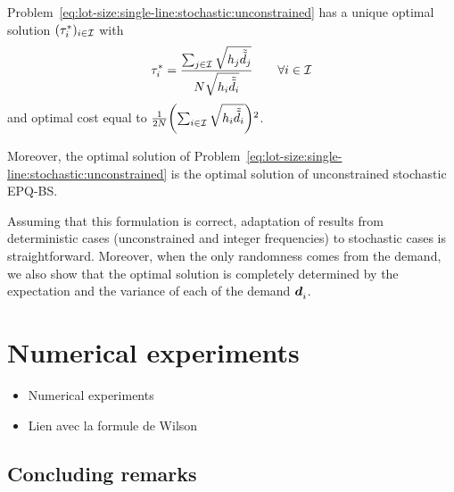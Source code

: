 \begin{thm}\label{thm:lot-size:single-line:stochastic:unconstrained:optimality}
Problem~\eqref{eq:lot-size:single-line:stochastic:unconstrained} has a unique optimal solution $(\tau_i^*)_{i\in\mathcal{I}}$ with
\begin{equation}
  \tau_i^*= \frac{\sum_{j\in\mathcal{I}}\sqrt{h_j\tilde{\tilde{d}}_j}}{N\sqrt{h_i\tilde{\tilde{d}}_i}}\qquad\forall i\in\mathcal{I}
\end{equation}
and optimal cost equal to $\frac{1}{2\nbsetups}\bracket{\sum_{i\in\REF}\sqrt{\holding_i\tilde{\tilde{\demand}}_i}}^2$.

Moreover, the optimal solution of Problem~\eqref{eq:lot-size:single-line:stochastic:unconstrained} is the optimal solution of unconstrained stochastic EPQ-BS.
\end{thm}


Assuming that this formulation is correct, adaptation of results from deterministic cases (unconstrained and integer frequencies) to stochastic cases is straightforward.
Moreover, when the only randomness comes from the demand, we also show that the optimal solution is completely determined by the expectation and the variance of each of the demand $\va\demand_i$.






\section{Numerical experiments}

\begin{itemize}
  \item Numerical experiments
  \item Lien avec la formule de Wilson
\end{itemize}


\subsection{Concluding remarks}



